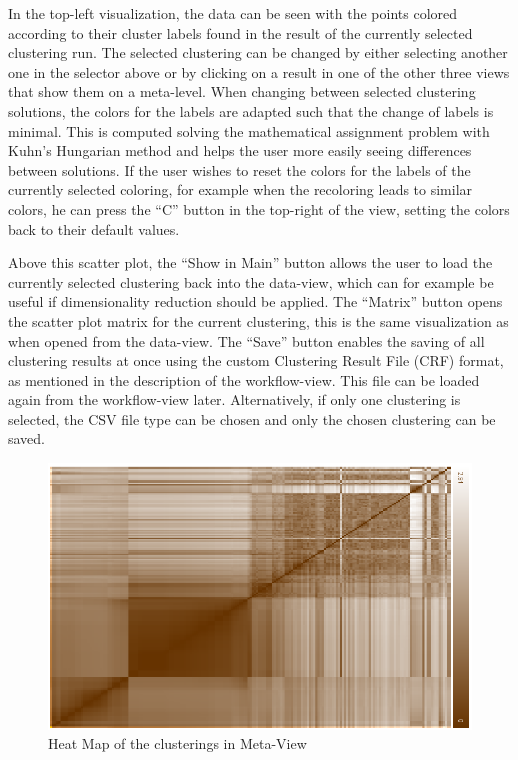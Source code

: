 \documentclass[
	a4paper,
	english,
	twoside,
	openright,               
	11pt                            
	]{report}
\begin{document}
In the top-left visualization, the data can be seen with the points colored according to their cluster labels found in the result of the currently selected clustering run. The selected clustering can be changed by either selecting another one in the selector above or by clicking on a result in one of the other three views that show them on a meta-level. When changing between selected clustering solutions, the colors for the labels are adapted such that the change of labels is minimal. This is computed solving the mathematical assignment problem with Kuhn’s Hungarian method \cite{Kuhn2010} and helps the user more easily seeing differences between solutions. If the user wishes to reset the colors for the labels of the currently selected coloring, for example when the recoloring leads to similar colors, he can press the ``C'' button in the top-right of the view, setting the colors back to their default values.

Above this scatter plot, the ``Show in Main'' button allows the user to load the currently selected clustering back into the data-view, which can for example be useful if dimensionality reduction should be applied. The ``Matrix'' button opens the scatter plot matrix for the current clustering, this is the same visualization as when opened from the data-view. The ``Save'' button enables the saving of all clustering results at once using the custom Clustering Result File (CRF) format, as mentioned in the description of the workflow-view. This file can be loaded again from the workflow-view later. Alternatively, if only one clustering is selected, the CSV file type can be chosen and only the chosen clustering can be saved.

\begin{figure}[h]
	\centering
	\includegraphics[scale=.45]{heat-map}
	\caption{Heat Map of the clusterings in Meta-View}
	\label{fig:heatmap}
\end{figure}
\end{document}
